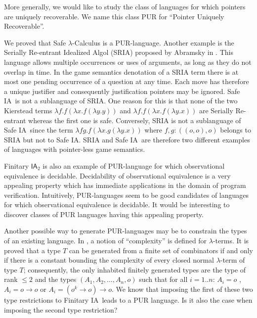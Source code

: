 \documentclass{llncs}
\newcommand\ialgol{\textsf{IA}}
\begin{document}
More generally, we would like to study the class of languages for
which pointers are uniquely recoverable. We name this class PUR for
``Pointer Uniquely Recoverable''.

We proved that Safe $\lambda$-Calculus is a PUR-language. Another
example is the Serially Re-entrant Idealized Algol (SRIA) proposed
by Abramsky  in \cite{abramsky:mchecking_ia}. This language allows
multiple occurrences or uses of arguments, as long as they do not
overlap in time. In the game semantics denotation of a SRIA term
there is at most one pending occurrence of a question at any time.
Each move has therefore a unique justifier and consequently
justification pointers may be ignored. Safe \ialgol\ is not a
sublanguage of SRIA. One reason for this is that none of the two
Kierstead terms $\lambda f . f (\lambda x . f (\lambda y .y ))$ and
$\lambda f . f (\lambda x . f (\lambda y .x ))$ are Serially
Re-entrant whereas the first one is safe. Conversely, SRIA is not a
sublanguage of Safe \ialgol\ since the term $\lambda f g. f (\lambda
x . g (\lambda y .x ))$ where $f,g:((o,o),o)$ belongs to SRIA but
not to Safe \ialgol. SRIA and Safe \ialgol\ are therefore two
different examples of languages with pointer-less game semantics.

Finitary $\ialgol_2$ is also an example of PUR-language for which
observational equivalence is decidable. Decidability of observational equivalence is a very
appealing property which has immediate applications in the domain of
program verification. Intuitively, PUR-languages seem to be good
candidates of languages for which observational equivalence is
decidable. It would be interesting to discover classes of PUR
languages having this appealing property.

Another possible way to generate PUR-languages may be to constrain
the types of an existing language. In \cite{DBLP:conf/tlca/Joly01},
a notion of ``complexity'' is defined for $\lambda$-terms. It is
proved that a type $T$ can be generated from a finite set of
combinators if and only if there is a constant bounding the
complexity of every closed normal $\lambda$-term of type $T$;
consequently, the only inhabited finitely generated types are the
type of rank $\leq 2$ and the types $(A_1, A_2, \ldots, A_n, o)$
such that for all $i = 1..n$: $A_i = o$ , $A_i = o \rightarrow o$ or
$A_i = (o^k \rightarrow o) \rightarrow o$. We know that imposing the
first of these two type restrictions to Finitary \ialgol\ leads to a
PUR language. Is it also the case when imposing the second type
restriction?




\end{document}
